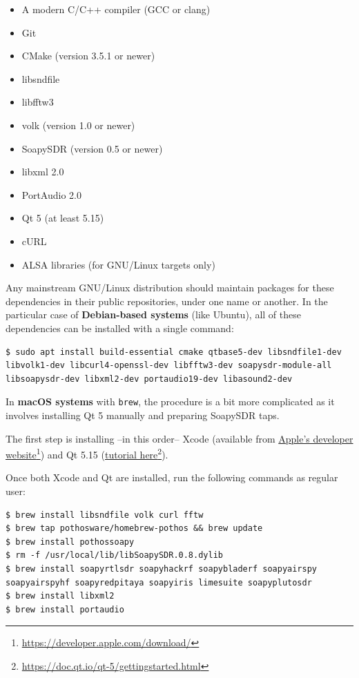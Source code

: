 \documentclass{ol-softwaremanual}
\newcommand{\doclink}[2]{\href{#1}{#2}\footnote{\url{#1}}}
\begin{document}
\begin{itemize}
    \item A modern C/C++ compiler (GCC or clang)
    \item Git
    \item CMake (version 3.5.1 or newer)
    \item libsndfile
    \item libfftw3
    \item volk (version 1.0 or newer)
    \item SoapySDR (version 0.5 or newer)
    \item libxml 2.0
    \item PortAudio 2.0
    \item Qt 5 (at least 5.15)
    \item cURL
    \item ALSA libraries (for GNU/Linux targets only)
\end{itemize}

Any mainstream GNU/Linux distribution should maintain packages for these dependencies in their public repositories, under one name or another. In the particular case of \textbf{Debian-based systems} (like Ubuntu), all of these dependencies can be installed with a single command:

\begin{lstlisting}
$ sudo apt install build-essential cmake qtbase5-dev libsndfile1-dev libvolk1-dev libcurl4-openssl-dev libfftw3-dev soapysdr-module-all libsoapysdr-dev libxml2-dev portaudio19-dev libasound2-dev 
\end{lstlisting}

In \textbf{macOS systems} with \texttt{brew}, the procedure is a bit more complicated as it involves installing Qt 5 manually and preparing SoapySDR taps.

The first step is installing --in this order-- Xcode (available from \doclink{https://developer.apple.com/download/}{Apple's developer website}) and Qt 5.15 (\doclink{https://doc.qt.io/qt-5/gettingstarted.html}{tutorial here}).

Once both Xcode and Qt are installed, run the following commands as regular user:

\begin{lstlisting}
$ brew install libsndfile volk curl fftw
$ brew tap pothosware/homebrew-pothos && brew update
$ brew install pothossoapy
$ rm -f /usr/local/lib/libSoapySDR.0.8.dylib
$ brew install soapyrtlsdr soapyhackrf soapybladerf soapyairspy soapyairspyhf soapyredpitaya soapyiris limesuite soapyplutosdr
$ brew install libxml2
$ brew install portaudio
\end{lstlisting}
\end{document}
